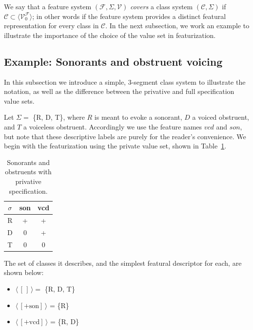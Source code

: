 \documentclass[11pt, oneside]{article}   	%
\begin{document}
\vspace{\baselineskip} We say that a feature system $(\mathcal F, \Sigma, \mathcal V)$ \textit{covers} a class system $(\mathcal C, \Sigma)$ if $\mathcal C \subset \langle \mathcal V_0^\mathcal F \rangle$; in other words if the feature system provides a distinct featural representation for every class in $\mathcal C$. In the next subsection, we work an example to illustrate the importance of the choice of the value set in featurization.

\subsection{Example: Sonorants and obstruent voicing}

In this subsection we introduce a simple, 3-segment class system to illustrate the notation, as well as the difference between the privative and full specification value sets.

Let $\Sigma =$ \{R, D, T\}, where $R$ is meant to evoke a sonorant, $D$ a voiced obstruent, and $T$ a voiceless obstruent. Accordingly we use the feature names $vcd$ and $son$, but note that these descriptive labels are purely for the reader's convenience. We begin with the featurization using the private value set, shown in Table~\ref{table:privative}.

\begin{table}[h]
    \centering
    \begin{tabular} {|c||c|c|}
    \hline
        $\sigma$ & son & vcd \\ \hline
        R & + & + \\
        D & 0 & + \\
        T & 0 & 0 \\
        \hline
    \end{tabular}
    \caption{Sonorants and obstruents with privative specification.}
    \label{table:privative}
\end{table}

\noindent The set of classes it describes, and the simplest featural descriptor for each, are shown below: \begin{itemize}
  \item $\langle \, [\,] \, \rangle = $ \{R, D, T\}
  \item $\langle \, [+\text{son}] \, \rangle$ = \{R\}
  \item $\langle \, [+\text{vcd}] \, \rangle$ = \{R, D\}
  \end{itemize}
  
\end{document}
